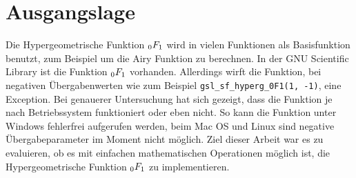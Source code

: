 %
%
%
\section{Ausgangslage\label{0f1:section:ausgangslage}}
Die Hypergeometrische Funktion $\mathstrut_0F_1$ wird in vielen Funktionen als Basisfunktion benutzt, 
zum Beispiel um die Airy Funktion zu berechnen. 
In der GNU Scientific Library \cite{library-gsl} 
ist die Funktion $\mathstrut_0F_1$ vorhanden. 
Allerdings wirft die Funktion, bei negativen Übergabenwerten wie zum Beispiel \verb+gsl_sf_hyperg_0F1(1, -1)+, eine Exception. 
Bei genauerer Untersuchung hat sich gezeigt, dass die Funktion je nach Betriebssystem funktioniert oder eben nicht. 
So kann die Funktion unter Windows fehlerfrei aufgerufen werden, beim Mac OS und Linux sind negative Übergabeparameter im Moment nicht möglich.
Ziel dieser Arbeit war es zu evaluieren, ob es mit einfachen mathematischen Operationen möglich ist, die Hypergeometrische Funktion $\mathstrut_0F_1$ zu implementieren.
